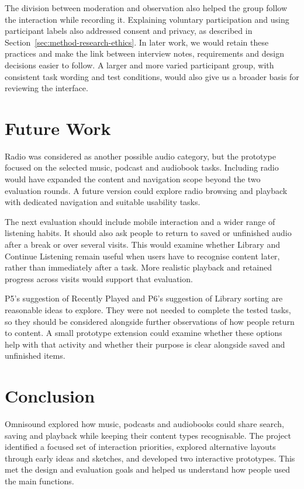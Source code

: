 The division between moderation and observation also helped the group
follow the interaction while recording it. Explaining voluntary
participation and using participant labels also addressed consent and
privacy, as described in Section~\ref{sec:method-research-ethics}.
In later work, we would retain these practices and make the link between
interview notes, requirements and design decisions easier to follow. A
larger and more varied participant group, with consistent task wording and
test conditions, would also give us a broader basis for reviewing the
interface.

\section{Future Work}
\label{sec:future-work}

Radio was considered as another possible audio category, but the prototype focused on the selected music, podcast and audiobook tasks. Including radio would have expanded the content and navigation scope beyond the two evaluation rounds. A future version could explore radio browsing and playback with dedicated navigation and suitable usability tasks.

The next evaluation should include mobile interaction and a wider range
of listening habits. It should also ask people to return to saved or
unfinished audio after a break or over several visits. This would examine
whether Library and Continue Listening remain useful when users have to
recognise content later, rather than immediately after a task. More
realistic playback and retained progress across visits would support that
evaluation.

P5's suggestion of Recently Played and P6's suggestion of Library sorting
are reasonable ideas to explore. They were not needed to complete the
tested tasks, so they should be considered alongside further observations
of how people return to content. A small prototype extension could examine
whether these options help with that activity and whether their purpose
is clear alongside saved and unfinished items.

\section{Conclusion}
\label{sec:conclusion}

Omnisound explored how music, podcasts and audiobooks could share search,
saving and playback while keeping their content types recognisable. The
project identified a focused set of interaction priorities, explored
alternative layouts through early ideas and sketches, and developed two
interactive prototypes. This met the design and evaluation goals and helped
us understand how people used the main functions.

